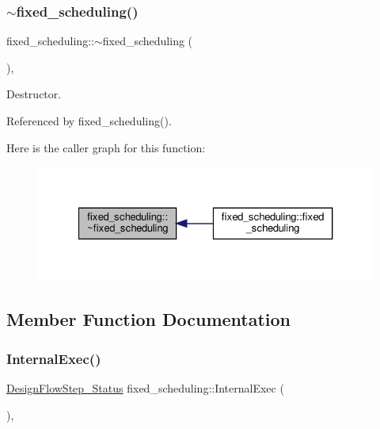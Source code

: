 \subsubsection{\texorpdfstring{$\sim$fixed\+\_\+scheduling()}{~fixed\_scheduling()}}
{\footnotesize\ttfamily fixed\+\_\+scheduling\+::$\sim$fixed\+\_\+scheduling (\begin{DoxyParamCaption}{ }\end{DoxyParamCaption})\hspace{0.3cm}{\ttfamily [override]}, {\ttfamily [default]}}



Destructor. 



Referenced by fixed\+\_\+scheduling().

Here is the caller graph for this function\+:
\nopagebreak
\begin{figure}[H]
\begin{center}
\leavevmode
\includegraphics[width=327pt]{d2/d79/classfixed__scheduling_a05b14aa177b8fb7def29ea848de939d8_icgraph}
\end{center}
\end{figure}


\subsection{Member Function Documentation}
\mbox{\label{classfixed__scheduling_a7dbf0a071862208536ac8fa0803cf8d7}} 
\subsubsection{\texorpdfstring{Internal\+Exec()}{InternalExec()}}
{\footnotesize\ttfamily \hyperlink{design__flow__step_8hpp_afb1f0d73069c26076b8d31dbc8ebecdf}{Design\+Flow\+Step\+\_\+\+Status} fixed\+\_\+scheduling\+::\+Internal\+Exec (\begin{DoxyParamCaption}{ }\end{DoxyParamCaption})\hspace{0.3cm}{\ttfamily [override]}, {\ttfamily [virtual]}}



